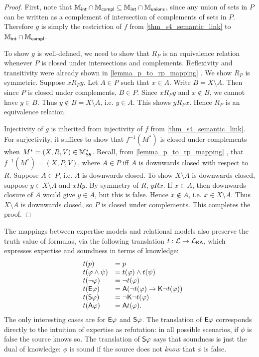 \begin{proof}
    First, note that $\Mint \cap \Mcompl \subseteq \Mint \cap
    \Munions$, since any union of sets in $P$ can be written as a
    complement of intersection of complements of sets in $P$. Therefore
    $g$ is simply the restriction of $f$ from
    \cref{thm_s4_semantic_link} to $\Mint \cap \Mcompl$.

    To show $g$ is well-defined, we need to show that $R_P$ is an equivalence
    relation whenever $P$ is closed under intersections and complements.
    Reflexivity and transitivity were already shown in
    \cref{lemma_p_to_rp_mapping} . We show $R_P$ is
    symmetric.  Suppose $x{R_P}y$. Let $A \in P$ such that $x \in A$.  Write $B
    = X \setminus A$. Then since $P$ is closed under complements, $B \in P$.
    Since $x{R_P}y$ and $x \notin B$, we cannot have $y \in B$. Thus $y \notin
    B = X \setminus A$, i.e. $y \in A$. This shows $y{R_P}x$. Hence $R_P$ is an
    equivalence relation.

    Injectivity of $g$ is inherited from injectivity of $f$ from
    \cref{thm_s4_semantic_link}. For surjectivity, it suffices to show that
    $f^{-1}(M^*)$ is closed under complements when $M^* = (X, R, V) \in
    \Msfive$. Recall, from \cref{lemma_p_to_rp_mapping}
    , that $f^{-1}(M^*) = (X, P, V)$, where $A
    \in P$ iff $A$ is downwards closed with respect to $R$. Suppose $A \in P$,
    i.e. $A$ is downwards closed. To show $X \setminus A$ is downwards closed,
    suppose $y \in X \setminus A$ and $xRy$.  By symmetry of $R$, $yRx$. If $x
    \in A$, then downwards closure of $A$ would give $y \in A$, but this is
    false. Hence $x \notin A$, i.e. $x \in X \setminus A$. Thus $X \setminus A$
    is downwards closed, so $P$ is closed under complements. This completes the
    proof.
\end{proof}

The mappings between expertise models and relational models also preserve the
truth value of formulas, via the following translation $t: \cL \to
\cLKA$, which expresses expertise and soundness in terms of knowledge:
\[
\begin{array}{lll}
 &t(p) &= p \\
 &t(\phi \land \psi) &= t(\phi) \land t(\psi) \\
 &t(\neg\phi) &= \neg t(\phi) \\
 &t(\E\phi) &= \A(\neg t(\phi) \limplies \K\neg t(\phi)) \\
 &t(\S\phi) &= \neg\K\neg t(\phi) \\
 &t(\A\phi) &= \A t(\phi).
\end{array}
\]
The only interesting cases are for $\E\phi$ and $\S\phi$. The
translation of $\E\phi$ corresponds directly to the intuition of
expertise as refutation: in all possible scenarios, if $\phi$ is false
the source knows so. The translation of $\S\phi$ says that soundness is
just the dual of knowledge: $\phi$ is sound if the source does not \emph{know}
that $\phi$ is false.

